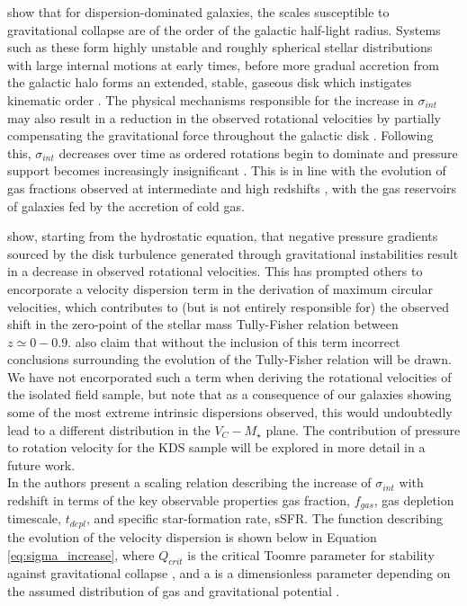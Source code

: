\documentclass[fleqn,usenatbib]{mnras}
\begin{document}
\cite{Genzel2011} show that for dispersion-dominated galaxies, the scales susceptible to gravitational collapse are of the order of the galactic half-light radius. 
Systems such as these form highly unstable and roughly spherical stellar distributions with large internal motions at early times, before more gradual accretion from the galactic halo forms an extended, stable, gaseous disk which instigates kinematic order \citep{Law2009,Genzel2011}.
The physical mechanisms responsible for the increase in $\sigma_{int}$ may also result in a reduction in the observed rotational velocities by partially compensating the gravitational force throughout the galactic disk \citep[e.g.][]{Burkert2010,Wuyts2016b,Ubler2017,Genzel2017,Lang2017}.
Following this, $\sigma_{int}$ decreases over time as ordered rotations begin to dominate and pressure support becomes increasingly insignificant \citep[e.g.][]{Burkert2010,Ubler2017,Genzel2017,Lang2017}.
This is in line with the evolution of gas fractions observed at intermediate and high redshifts \citep[e.g.][]{Saintonge2013,Tacconi2013,Tacconi2017}, with the gas reservoirs of galaxies fed by the accretion of cold gas.

\cite{Burkert2010} show, starting from the hydrostatic equation, that negative pressure gradients sourced by the disk turbulence generated through gravitational instabilities result in a decrease in observed rotational velocities. 
This has prompted others \citep[e.g.][]{Wuyts2016b,Ubler2017,Lang2017} to encorporate a velocity dispersion term in the derivation of maximum circular velocities, which contributes to (but is not entirely responsible for) the observed shift in the zero-point of the stellar mass Tully-Fisher relation between $z\simeq0-0.9$.
\cite{Ubler2017} also claim that without the inclusion of this term incorrect conclusions surrounding the evolution of the Tully-Fisher relation will be drawn.
We have not encorporated such a term when deriving the rotational velocities of the isolated field sample, but note that as a consequence of our galaxies showing some of the most extreme intrinsic dispersions observed, this would undoubtedly lead to a different distribution in the $V_{C}-M_{\star}$ plane.
The contribution of pressure to rotation velocity for the KDS sample will be explored in more detail in a future work. 
\\

In \cite{Wisnioski2015} the authors present a scaling relation describing the increase of $\sigma_{int}$ with redshift in terms of the key observable properties gas fraction, $f_{gas}$, gas depletion timescale, $t_{depl}$, and specific star-formation rate, sSFR.
The function describing the evolution of the velocity dispersion is shown below in Equation \ref{eq:sigma_increase}, where $Q_{crit}$ is the critical Toomre parameter for stability against gravitational collapse \citep{Toomre1964}, and a is a dimensionless parameter depending on the assumed distribution of gas and gravitational potential \cite{ForsterSchreiber2006}. 
\end{document}
